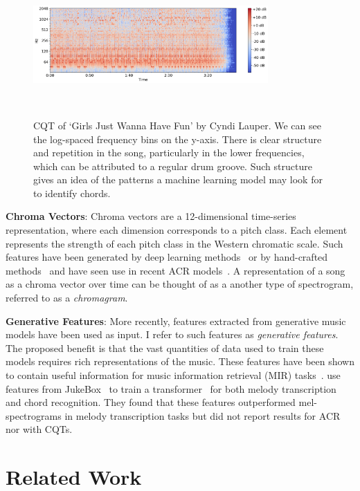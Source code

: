 \begin{figure}[h]
    \centering
    \includegraphics[width=0.8\textwidth]{figures/sample_cqt.png}
    \caption{CQT of `Girls Just Wanna Have Fun' by Cyndi Lauper. We can see the log-spaced frequency bins on the y-axis. There is clear structure and repetition in the song, particularly in the lower frequencies, which can be attributed to a regular drum groove. Such structure gives an idea of the patterns a machine learning model may look for to identify chords.}~\label{fig:cqt_example}
\end{figure}

\textbf{Chroma Vectors}: Chroma vectors are a 12-dimensional time-series representation, where each dimension corresponds to a pitch class. Each element represents the strength of each pitch class in the Western chromatic scale. Such features have been generated by deep learning methods~\citep{BalanceRandomForestACR} or by hand-crafted methods~\citep{NNLSChroma,librosa} and have seen use in recent ACR models~\citep{HarmonyTransformer}. A representation of a song as a chroma vector over time can be thought of as a another type of spectrogram, referred to as a \emph{chromagram}.

\textbf{Generative Features}: More recently, features extracted from generative music models have been used as input. I refer to such features as \emph{generative features}. The proposed benefit is that the vast quantities of data used to train these models requires rich representations of the music. These features have been shown to contain useful information for music information retrieval (MIR) tasks~\citep{GenerativeFeaturesforMIR}. \citet{MelodyTranscriptionViaGenerativePreTraining} use features from JukeBox~\citep{Jukebox} to train a transformer~\citep{AttentionIsAllYouNeed} for both melody transcription and chord recognition. They found that these features outperformed mel-spectrograms in melody transcription tasks but did not report results for ACR nor with CQTs.


\section{Related Work}\label{sec:related_work}

